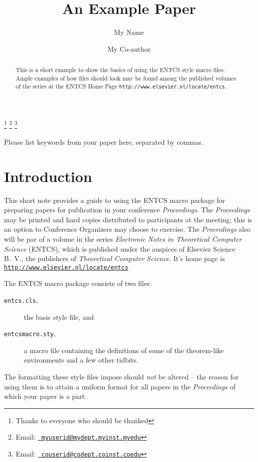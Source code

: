 \documentclass{entcs} \usepackage{entcsmacro}
\begin{document}
\begin{frontmatter}
  \title{An Example Paper} \author{My
    Name}
  \address{My Department\\ My University\\
    My City, My Country} \author{My Co-author}
  \address{My Co-author's Department\\My Co-author's University\\
    My Co-author's City, My Co-author's Country} \thanks[ALL]{Thanks
    to everyone who should be thanked} \thanks[myemail]{Email:
    \href{mailto:myuserid@mydept.myinst.myedu} {\texttt{\normalshape
        myuserid@mydept.myinst.myedu}}} \thanks[coemail]{Email:
    \href{mailto:couserid@codept.coinst.coedu} {\texttt{\normalshape
        couserid@codept.coinst.coedu}}}
\begin{abstract} 
  This is a short example to show the basics of using the ENTCS style
  macro files.  Ample examples of how files should look may be found
  among the published volumes of the series at the ENTCS Home Page
  \texttt{http://www.elsevier.nl/locate/entcs}.
\end{abstract}
\begin{keyword}
  Please list keywords from your paper here, separated by commas.
\end{keyword}
\end{frontmatter}
\section{Introduction}\label{intro}
This short note provides a guide to using the ENTCS macro package for
preparing papers for publication in your conference
\emph{Proceedings}. The \emph{Proceedings} may be printed and hard
copies distributed to participants at the meeting; this is an option
to Conference Organizers may choose to exercise.  The
\emph{Proceedings} also will be par of a volume in the series
\emph{Electronic Notes in Theoretical Computer Science} (ENTCS), which
is published under the auspices of Elsevier Science B.~V., the
publishers of \emph{Theoretical Computer Science}. It's home page is
\href{http://www.elsevier.nl/locate/entcs}
{\texttt{http://www.elsevier.nl/locate/entcs}}

The ENTCS macro package consists of two files:
\begin{description}
\item[\texttt{entcs.cls},] the basic style file, and
\item[\texttt{entcsmacro.sty},] a macro file containing the
  definitions of some of the theorem-like environments and a few other
  tidbits.
\end{description}
The formatting these style files impose should \emph{not} be altered
-- the reason for using them is to attain a uniform format for all
papers in the \emph{Proceedings} of which your paper is a part.
\end{document}
